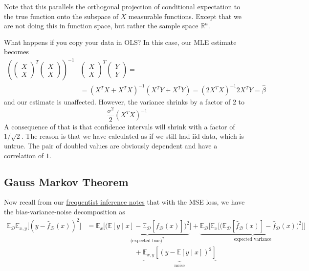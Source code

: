   Note that this parallels the orthogonal projection of conditional expectation to the true function onto the subspace of $X$ measurable functions. Except that we are not doing this in function space, but rather the sample space $\mathbb{R}^n$. 

  \begin{example}
    What happens if you copy your data in OLS? In this case, our MLE estimate becomes 
    \begin{align*}
        \left(\begin{pmatrix}X \\ X \end{pmatrix}^T \begin{pmatrix} X \\ X \end{pmatrix} \right )^{-1} & \begin{pmatrix} X \\ X  \end{pmatrix}^T \begin{pmatrix} Y \\ Y  \end{pmatrix}  =\\
    & = (X^T X + X^T X)^{-1} (X^T Y + X^T Y ) = (2 X^T X)^{-1} 2 X^T Y = \hat{\beta}
    \end{align*}
    and our estimate is unaffected. However, the variance shrinks by a factor of $2$ to 
    \begin{equation}
      \frac{\sigma^2}{2} (X^T X)^{-1}
    \end{equation}
    A consequence of that is that confidence intervals will shrink with a factor of $1/\sqrt{2}$. The reason is that we have calculated as if we still had iid data, which is untrue. The pair of doubled values are obviously dependent and have a correlation of $1$. 
  \end{example}

\subsection{Gauss Markov Theorem}

  Now recall from our \hyperref[fi-bias_variance_mse]{frequentist inference notes} that with the MSE loss, we have the bias-variance-noise decomposition as 
  \begin{align}
    \mathbb{E}_{\mathcal{D}} \mathbb{E}_{x, y} \big[ (y - \hat{f}_{\mathcal{D}}(x))^2 \big] 
    & = \mathbb{E}_{x} \big[ \underbrace{ \big( \mathbb{E}[y \mid x] - \mathbb{E}_{\mathcal{D}} [\hat{f}_\mathcal{D} (x)] \big)^2}_{\text{(expected bias)}^2} \big] + \underbrace{ \mathbb{E}_\mathcal{D} \big[ \mathbb{E}_{x} \big[ \big( \mathbb{E}_\mathcal{D} [\hat{f}_\mathcal{D} (x)] - \hat{f}_\mathcal{D} (x) \big)^2 \big] \big]}_{\text{expected variance}} \\ 
    & \;\;\;\;\;\;\;\;\;\;\;\;\;\;\;\;\;\;\;\;\;\;\;\;\; + \underbrace{\mathbb{E}_{x, y} [(y - \mathbb{E}[y \mid x])^2]}_{\text{noise}}
  \end{align}

